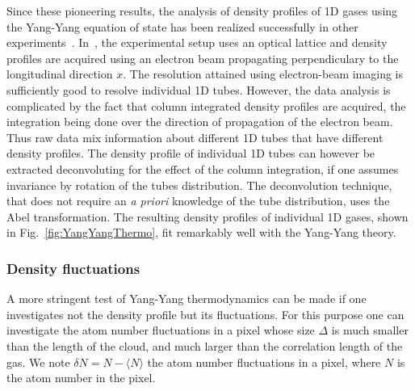 \documentclass[onecolumn,amsfonts,showpacs,superscriptaddress]{revtex4-1}
\begin{document}
 
 Since these pioneering results, the analysis of density profiles of 1D gases using the Yang-Yang equation of state has been realized successfully in other experiments~\citep{armijo_mapping_2011,vogler_thermodynamics_2013}. In~\citep{vogler_thermodynamics_2013}, 
 the experimental setup uses an optical lattice and density profiles are acquired using an electron beam
 propagating perpendiculary to the longitudinal
 direction $x$.
 The resolution attained using electron-beam imaging is 
 sufficiently good to resolve individual 1D tubes.
However, the data analysis is complicated by the fact that column integrated density profiles are acquired, the integration being done over the direction of propagation of the electron beam. Thus raw data mix
 information about different 1D tubes
 that have different density profiles. The density profile of individual 1D tubes can however be extracted deconvoluting for the 
 effect of the column integration, if one assumes invariance by rotation of the tubes distribution.
 The deconvolution technique, that does not 
 require an {\it a priori} knowledge of the 
 tube distribution, uses the Abel transformation.
 The resulting density profiles of individual 1D gases, shown in Fig.~\ref{fig:YangYangThermo}, fit remarkably well with the Yang-Yang theory.
 

\subsubsection{Density fluctuations}
\label{subsubsec:densityfluctu}
A more stringent test of Yang-Yang thermodynamics %
can be made if one
investigates not
the density profile but its fluctuations. For this purpose
one can investigate the
atom number fluctuations in a pixel whose size $\Delta$ is much smaller
than the length of the cloud, and much larger than the correlation
length of the gas. We note $\delta N=N-\langle N\rangle$ the
atom number fluctuations in a pixel, where $N$ is the atom number in the pixel.
\end{document}
